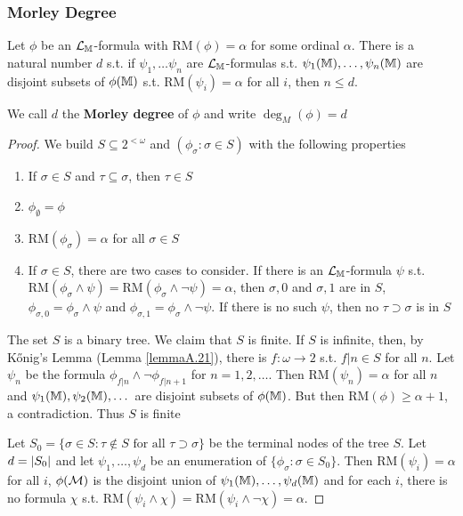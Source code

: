\documentclass[11pt]{article}
\def \RM {\text{RM}}
\begin{document}
\subsubsection{Morley Degree}
\label{sec:org7668a88}
\begin{proposition}[]
Let \(\phi\) be an \(\mathcal{L}_{\mathbb{M}}\)-formula with \(\RM(\phi)=\alpha\) for some ordinal \(\alpha\). There is a natural
number \(d\) s.t. if \(\psi_1,\dots\psi_n\) are \(\mathcal{L}_{\mathbb{M}}\)-formulas s.t. \(\psi_1(\mathbb{M}),\dots,\psi_n(\mathbb{M})\) are disjoint
subsets of \(\phi(\mathbb{M})\) s.t. \(\RM(\psi_i)=\alpha\) for all \(i\), then \(n\le d\).

We call \(d\) the \textbf{Morley degree} of \(\phi\) and write \(\deg_M(\phi)=d\)
\end{proposition}

\begin{proof}
We build \(S\subseteq 2^{<\omega}\) and \((\phi_\sigma:\sigma\in S)\) with the following properties
\begin{enumerate}
\item If \(\sigma\in S\) and \(\tau\subseteq\sigma\), then \(\tau\in S\)
\item \(\phi_\emptyset=\phi\)
\item \(\RM(\phi_\sigma)=\alpha\) for all \(\sigma\in S\)
\item If \(\sigma\in S\), there are two cases to consider. If there is an \(\mathcal{L}_{\mathbb{M}}\)-formula \(\psi\)
s.t. \(\RM(\phi_\sigma\wedge\psi)=\RM(\phi_\sigma\wedge\neg\psi)=\alpha\), then \(\sigma,0\) and \(\sigma,1\) are in \(S\), \(\phi_{\sigma,0}=\phi_\sigma\wedge\psi\)
and \(\phi_{\sigma,1}=\phi_\sigma\wedge\neg\psi\). If there is no such \(\psi\), then no \(\tau\supset\sigma\) is in \(S\)
\end{enumerate}


The set \(S\) is a binary tree. We claim that \(S\) is finite. If \(S\) is infinite, then, by
Kőnig's Lemma (Lemma \ref{lemmaA.21}), there is \(f:\omega\to 2\) s.t. \(f|n\in S\) for all \(n\).
Let \(\psi_n\) be the formula \(\phi_{f|n}\wedge\neg\phi_{f|n+1}\) for \(n=1,2,\dots\). Then \(\RM(\psi_n)=\alpha\) for
all \(n\)
and \(\psi_1(\mathbb{M}),\psi_2(\mathbb{M}),\dots\) are disjoint subsets of \(\phi(\mathbb{M})\). But then \(\RM(\phi)\ge\alpha+1\), a
contradiction. Thus \(S\) is finite

Let \(S_0=\{\sigma\in S:\tau\notin S\text{ for all }\tau\supset\sigma\}\) be the terminal nodes of the tree \(S\).
Let \(d=\abs{S_0}\) and let \(\psi_1,\dots,\psi_d\) be an enumeration of \(\{\phi_\sigma:\sigma\in S_0\}\).
Then \(\RM(\psi_i)=\alpha\) for all \(i\), \(\phi(\mathcal{M})\) is the disjoint union of \(\psi_1(\mathbb{M}),\dots,\psi_d(\mathbb{M})\) and for
each \(i\), there is no formula \(\chi\) s.t. \(\RM(\psi_i\wedge\chi)=\RM(\psi_i\wedge\neg\chi)=\alpha\).


\end{proof}
\end{document}
